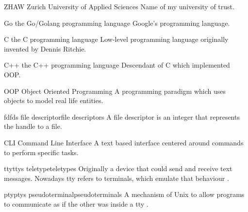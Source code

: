 

%
{ZHAW}{}%
{Zurich University of Applied Sciences}{}%
{Name of my university of trust.}

%
{Go}{}%
{the Go/Golang programming language}{}%
{Google's programming language.}

%
{C}{}%
{the C programming language}{}%
{Low-level programming language originally invented by Dennis Ritchie.}

%
{C++}{}%
{the C++ programming language}{}%
{Descendant of \gls{C} which implemented \gls{OOP}.}

%
{OOP}{}%
{Object Oriented Programming}{}%
{A programming paradigm which uses objects to model real life entities.}

%
{fd}{fds}%
{file descriptor}{file descriptors}%
{A file descriptor is an integer that represents the handle to a file.}

%
{CLI}{}%
{Command Line Interface}{}%
{A text based interface centered around commands to perform specific tasks.}

%
{tty}{ttys}%
{teletype}{teletypes}%
{Originally a device that could send and receive text messages. Nowadays \gls{tty} refers to \glspl{terminal}, which emulate that behaviour \citep{tty}.}

%
{pty}{ptys}%
{pseudoterminal}{pseudoterminals}%
{A mechanism of \gls{Unix} to allow programs to communicate as if the other was inside a \gls{tty} \citep{pty}.}

